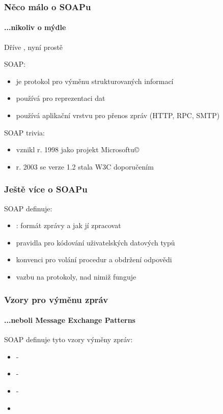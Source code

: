 \documentclass[12pt]{beamer}
\begin{document}
\begin{frame}
  \frametitle{Něco málo o SOAPu}
  \framesubtitle{...nikoliv o mýdle}

  Dříve , nyní prostě 

  \begin{block}{SOAP:}
    \begin{itemize}
      \item je protokol pro výměnu strukturovaných informací
      \item používá  pro reprezentaci dat
      \item používá aplikační vrstvu pro přenos zpráv (HTTP, RPC, SMTP)
    \end{itemize}
  \end{block}

  \begin{block}{SOAP trivia:}
    \begin{itemize}
      \item vznikl r. 1998 jako projekt Microsoftu\copyright
      \item r. 2003 se verze 1.2 stala W3C doporučením
    \end{itemize}
  \end{block}
\end{frame}

\begin{frame}
  \frametitle{Ještě více o SOAPu}

  \begin{block}{SOAP definuje:}
    \begin{itemize}
      \item {}: formát zprávy a jak jí zpracovat
      \item pravidla pro kódování uživatelských datových typů
      \item konvenci pro volání procedur a obdržení odpovědi
      \item vazbu na protokoly, nad nimiž funguje
    \end{itemize}
  \end{block}
\end{frame}

\begin{frame}
  \frametitle{Vzory pro výměnu zpráv}
  \framesubtitle{...neboli Message Exchange Patterns}

  \begin{block}{SOAP definuje tyto vzory výměny zpráv:}
    \begin{itemize}
      \item {} - 
      \item {} - 
      \item {} - 
      \item {}
    \end{itemize}
  \end{block}
\end{frame}
\end{document}
